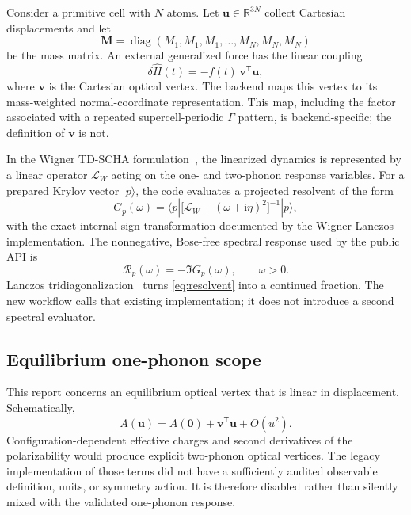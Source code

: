 \documentclass[11pt,a4paper]{article}
\newcommand{\ii}{\mathrm{i}}
\begin{document}
Consider a primitive cell with $N$ atoms.  Let
$\bm u\in\mathbb R^{3N}$ collect Cartesian displacements and let
\begin{equation}
  \bm M=\operatorname{diag}(M_1,M_1,M_1,\ldots,M_N,M_N,M_N)
\end{equation}
be the mass matrix.  An external generalized force has the linear coupling
\begin{equation}
  \delta \hat H(t)=-f(t)\,\bm v^{\mathsf T}\bm u,
  \label{eq:external-coupling}
\end{equation}
where $\bm v$ is the Cartesian optical vertex.  The backend maps this vertex
to its mass-weighted normal-coordinate representation.  This map, including
the factor associated with a repeated supercell-periodic $\Gamma$ pattern,
is backend-specific; the definition of $\bm v$ is not.

In the Wigner TD-SCHA formulation~\cite{siciliano2023}, the linearized
dynamics is represented by a linear operator $\mathcal L_W$ acting on the
one- and two-phonon response variables.  For a prepared Krylov vector
$|p\rangle$, the code evaluates a projected resolvent of the form
\begin{equation}
  G_p(\omega)=
  \langle p|\bigl[\mathcal L_W+(\omega+\ii\eta)^2\bigr]^{-1}|p\rangle,
  \label{eq:resolvent}
\end{equation}
with the exact internal sign transformation documented by the Wigner
Lanczos implementation.  The nonnegative, Bose-free spectral response used
by the public API is
\begin{equation}
  \mathcal R_p(\omega)=-\Im G_p(\omega),\qquad \omega>0.
  \label{eq:response}
\end{equation}
Lanczos tridiagonalization~\cite{lanczos1950} turns
\cref{eq:resolvent} into a continued fraction.  The new workflow calls that
existing implementation; it does not introduce a second spectral evaluator.

\subsection{Equilibrium one-phonon scope}

This report concerns an equilibrium optical vertex that is linear in
displacement.  Schematically,
\begin{equation}
  A(\bm u)=A(\bm 0)+\bm v^{\mathsf T}\bm u+O(u^2).
\end{equation}
Configuration-dependent effective charges and second derivatives of the
polarizability would produce explicit two-phonon optical vertices.  The
legacy implementation of those terms did not have a sufficiently audited
observable definition, units, or symmetry action.  It is therefore disabled
rather than silently mixed with the validated one-phonon response.
\end{document}
